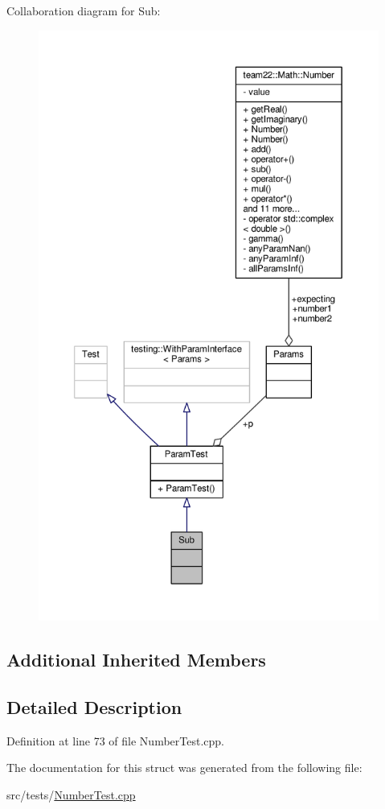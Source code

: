 Collaboration diagram for Sub\+:
\nopagebreak
\begin{figure}[H]
\begin{center}
\leavevmode
\includegraphics[height=550pt]{struct_sub__coll__graph}
\end{center}
\end{figure}
\subsection*{Additional Inherited Members}


\subsection{Detailed Description}


Definition at line 73 of file Number\+Test.\+cpp.



The documentation for this struct was generated from the following file\+:\begin{DoxyCompactItemize}
\item 
src/tests/\hyperlink{_number_test_8cpp}{Number\+Test.\+cpp}\end{DoxyCompactItemize}
